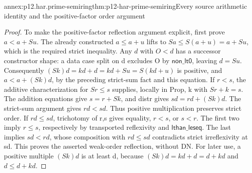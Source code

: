 \begin{annexitem}{annex:p12.har.prime-semiring}{thm:p12-har-prime-semiring}{Every source arithmetic identity and the positive-factor order argument}
\begin{proof}
To make the positive-factor reflection argument explicit, first prove
\(a<a+S u\). The already constructed \(a\le a+u\) lifts to
\(S a\le S(a+u)=a+S u\), which is the required strict inequality.
Any \(d\) with \(O<d\) has a successor constructor shape: a data
case split on d excludes O by \(\mathsf{non\_lt0}\), leaving \(d=S u\).
Consequently \((S k)d=kd+d=kd+S u=S(kd+u)\) is positive,
and \(a<a+(S k)d\), by the preceding strict-sum fact and this
equation. If \(r<s\), the additive characterization for
\(S r\le s\) supplies, locally in Prop, k with
\(S r+k=s\). The addition equations give \(s=r+S k\), and distr
gives \(sd=rd+(S k)d\). The strict-sum argument gives \(rd<sd\).
Thus positive multiplication preserves strict order.
If \(rd\le sd\), trichotomy of r,s gives equality, \(r<s\), or
\(s<r\). The first two imply \(r\le s\), respectively by
transported reflexivity and \(\mathsf{lthan\_leseq}\). The last implies \(sd<rd\),
whose composition with \(rd\le sd\) contradicts strict irreflexivity
at sd. This proves the asserted weak-order reflection, without DN.
For later use, a positive multiple \((S k)d\) is at least d,
because \((S k)d=kd+d=d+kd\) and \(d\le d+kd\).
\end{proof}
\end{annexitem}

